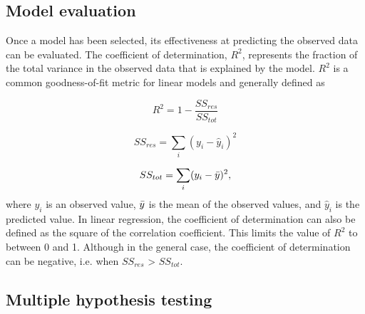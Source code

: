 \documentclass[../main.tex]{subfiles}
\begin{document}
\subsection{Model evaluation}

Once a model has been selected, its effectiveness at predicting the observed data can be evaluated. 
The coefficient of determination, $R^2$, represents the fraction of the total variance in the observed data that is explained by the model. 
$R^2$ is a common goodness-of-fit metric for linear models and generally defined as

$$R^2 = 1 - \frac{SS_{res}}{SS_{tot}}$$

$$SS_{res} = \sum_i (y_i - \hat{y}_i)^2$$

$$SS_{tot} = \sum_i(y_i - \Bar{y})^2,$$
where $y_i$ is an observed value, $\Bar{y}$ is the mean of the observed values, and $\hat{y}_i$ is the predicted value.
In linear regression, the coefficient of determination can also be defined as the square of the correlation coefficient.
This limits the value of $R^2$ to between 0 and 1.
Although in the general case, the coefficient of determination can be negative, i.e. when $SS_{res}$ > $SS_{tot}$.

\subsection{Multiple hypothesis testing}
\end{document}
